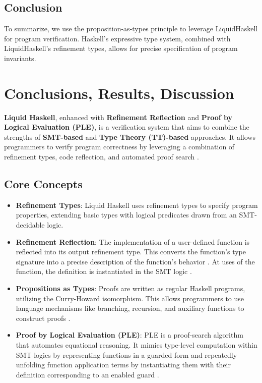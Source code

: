 \documentclass[]{rptuseminar}
\begin{document}
\subsection{Conclusion}
To summarize, we use the proposition-as-types principle to leverage LiquidHaskell for program verification.
Haskell's expressive type system, combined with LiquidHaskell's refinement types, allows for precise specification of program invariants.
\label{sec:example}

\section{Conclusions, Results, Discussion}
\textbf{Liquid Haskell}, enhanced with \textbf{Refinement Reflection} and \textbf{Proof by Logical Evaluation (PLE)}, 
is a verification system that aims to combine the strengths of \textbf{SMT-based} and 
\textbf{Type Theory (TT)-based} approaches. It allows programmers to verify program correctness 
by leveraging a combination of refinement types, code reflection, and automated proof search \cite{vazou_refinement_2018}.

\subsection*{Core Concepts}

\begin{itemize}
    \item \textbf{Refinement Types}: Liquid Haskell uses refinement types to specify program properties, 
        extending basic types with logical predicates drawn from an SMT-decidable logic.
    \item \textbf{Refinement Reflection}: The implementation of a user-defined function is reflected into 
      its output refinement type. This converts the function's type signature into a precise description of the function's behavior 
      . At uses of the function, the definition is instantiated in the SMT logic \cite{vazou_refinement_2018}.
   \item \textbf{Propositions as Types}: Proofs are written as regular Haskell programs, 
     utilizing the Curry-Howard isomorphism. This allows programmers to use language mechanisms 
     like branching, recursion, and auxiliary functions to construct proofs \cite{vazou_refinement_2018}.
   \item \textbf{Proof by Logical Evaluation (PLE)}: PLE is a proof-search algorithm that automates 
     equational reasoning. It mimics type-level computation within SMT-logics by representing 
     functions in a guarded form and repeatedly unfolding function application terms by instantiating them 
     with their definition corresponding to an enabled guard \cite{vazou_refinement_2018}.
\end{itemize}
\end{document}
